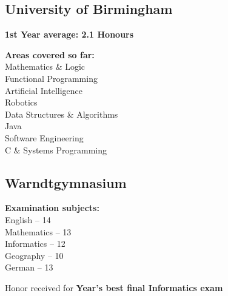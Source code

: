 \documentclass[]{jonas-cv}
\begin{document}
\begin{minipage}[t]{0.34\textwidth} 



\subsection{University of Birmingham}
\sectionsep

\begin{tightemize}
    \item \textbf{1st Year average: 2.1 Honours}
    \item \textbf{Areas covered so far:}\\
    Mathematics \& Logic \\
    Functional Programming \\
    Artificial Intelligence \\
    Robotics \\
    Data Structures \& Algorithms \\
    Java \\
    Software Engineering \\
    C \& Systems Programming \\
\end{tightemize}
\largesectionsep


\subsection{Warndtgymnasium}

\begin{tightemize}
    \item \textbf{Examination subjects:}\\
             English -- 14 \\
             Mathematics -- 13\\
             Informatics -- 12\\
             Geography -- 10\\
             German -- 13
    \item Honor received for \textbf{Year's best final Informatics exam}
\end{tightemize}
\largesectionsep


\end{minipage}
\end{document}

